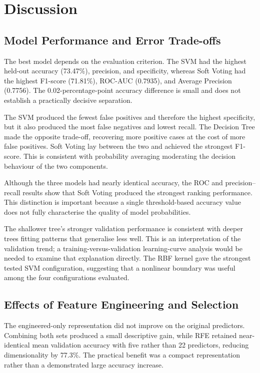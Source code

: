 \documentclass[11pt,a4paper]{article}
\begin{document}
\section{Discussion}

\subsection{Model Performance and Error Trade-offs}

The best model depends on the evaluation criterion. The SVM had the highest held-out accuracy (73.47\%), precision, and specificity, whereas Soft Voting had the highest F1-score (71.81\%), ROC-AUC (0.7935), and Average Precision (0.7756). The 0.02-percentage-point accuracy difference is small and does not establish a practically decisive separation.

The SVM produced the fewest false positives and therefore the highest specificity, but it also produced the most false negatives and lowest recall. The Decision Tree made the opposite trade-off, recovering more positive cases at the cost of more false positives. Soft Voting lay between the two and achieved the strongest F1-score. This is consistent with probability averaging moderating the decision behaviour of the two components.



Although the three models had nearly identical accuracy, the ROC and precision--recall results show that Soft Voting produced the strongest ranking performance. This distinction is important because a single threshold-based accuracy value does not fully characterise the quality of model probabilities.

The shallower tree's stronger validation performance is consistent with deeper trees fitting patterns that generalise less well. This is an interpretation of the validation trend; a training-versus-validation learning-curve analysis would be needed to examine that explanation directly. The RBF kernel gave the strongest tested SVM configuration, suggesting that a nonlinear boundary was useful among the four configurations evaluated.

\subsection{Effects of Feature Engineering and Selection}

The engineered-only representation did not improve on the original predictors. Combining both sets produced a small descriptive gain, while RFE retained near-identical mean validation accuracy with five rather than 22 predictors, reducing dimensionality by 77.3\%. The practical benefit was a compact representation rather than a demonstrated large accuracy increase.
\end{document}
